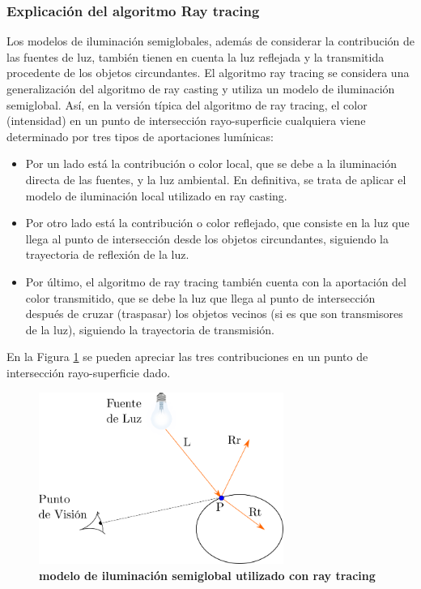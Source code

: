     
\subsubsection{Explicación del algoritmo Ray tracing}

Los modelos de iluminación semiglobales, además de considerar la contribución de las fuentes de luz, también tienen en cuenta la luz reflejada y la transmitida procedente de los objetos circundantes. El algoritmo ray tracing se considera una generalización del algoritmo de ray casting y utiliza un modelo de iluminación semiglobal.
Así, en la versión típica del algoritmo de ray tracing, el color (intensidad) en un punto de intersección rayo-superficie cualquiera viene determinado por tres tipos de aportaciones lumínicas:
\begin{itemize}
    \item Por un lado está la contribución o color local, que se debe a la iluminación directa de las fuentes, y la luz ambiental. En definitiva, se trata de aplicar el modelo de iluminación local utilizado en ray casting.
    \item Por otro lado está la contribución o color reflejado, que consiste en la luz que llega al punto de intersección desde los objetos circundantes, siguiendo la trayectoria de reflexión de la luz.
    \item Por último, el algoritmo de ray tracing también cuenta con la aportación del color transmitido, que se debe la luz que llega al punto de intersección después de cruzar (traspasar) los objetos vecinos (si es que son transmisores de la luz), siguiendo la trayectoria de transmisión. 

\end{itemize}

En la Figura \ref{fig:grafica9} se pueden apreciar las tres contribuciones en un punto de intersección rayo-superficie dado.

\begin{figure}[h]
    \includegraphics[width=8cm]{Img/CPD/grafica9.png}
    \centering
    \caption{\textbf{\footnotesize{ modelo de iluminación semiglobal utilizado con ray tracing  }}}
    \label{fig:grafica9}
\end{figure}

